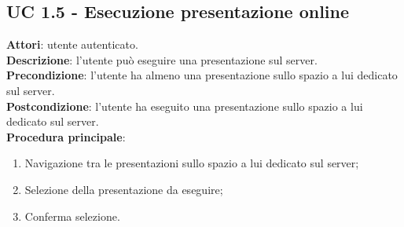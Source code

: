 \subsection{UC 1.5 - Esecuzione presentazione online}{
	\label{uc1.5}
	\textbf{Attori}: utente autenticato.\\
	\textbf{Descrizione}: l'utente può eseguire una presentazione sul server.\\
	\textbf{Precondizione}: l'utente ha almeno una presentazione sullo spazio a lui dedicato sul server.\\
	\textbf{Postcondizione}: l'utente ha eseguito una presentazione sullo spazio a lui dedicato sul server.\\
	\textbf{Procedura principale}:
	\begin{enumerate}
		\item Navigazione tra le presentazioni sullo spazio a lui dedicato sul server;
		\item Selezione della presentazione da eseguire;
		\item Conferma selezione.
	\end{enumerate}
}